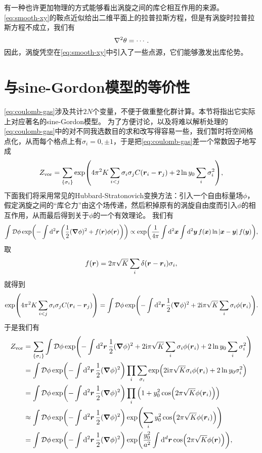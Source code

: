 \documentclass[hyperref, UTF8, a4paper]{ctexart}
\newcommand*{\ii}{\mathrm{i}}
\newcommand*{\fd}[1]{\mathcal{D} #1}
\begin{document}
有一种也许更加物理的方式能够看出涡旋之间的库仑相互作用的来源。\eqref{eq:smooth-xy}的鞍点近似给出二维平面上的拉普拉斯方程，但是有涡旋时拉普拉斯方程不成立，我们有
\[
    \laplacian \theta = \cdots.
\]
因此，涡旋凭空在\eqref{eq:smooth-xy}中引入了一些点源，它们能够激发出库伦势。

\section{与sine-Gordon模型的等价性}\label{sec:sine-gordon}


\eqref{eq:coulomb-gas}涉及共计$2N$个变量，不便于做重整化群计算。本节将指出它实际上对应著名的sine-Gordon模型。
为了方便讨论，以及将难以解析处理的\eqref{eq:coulomb-gas}中的对不同我选数目的求和改写得容易一些，我们暂时将空间格点化，从而每个格点上有$\sigma_i = 0, \pm 1$，于是把\eqref{eq:coulomb-gas}差一个常数因子地写成
\[
    Z_\text{vor} = \sum_{\{\sigma_i\}} \exp(4 \pi^2 K \sum_{i < j} \sigma_i \sigma_j C(\vb*{r}_i - \vb*{r}_j) + 2 \ln y_0 \sum_i \sigma_i^2),
\]
下面我们将采用常见的Hubbard-Stratonovich变换方法：引入一个自由标量场$\phi$，假定涡旋之间的“库仑力”由这个场传递，然后积掉原有的涡旋自由度而引入$\phi$的相互作用，从而最后得到关于$\phi$的一个有效理论。
我们有
\[
    \int \fd{\phi} \exp(- \int \dd[2]{\vb*{r}} \left( \frac{1}{2} (\grad{\phi})^2 + f(\vb*{r}) \phi(\vb*{r}) \right) ) \propto \exp(\frac{1}{4\pi} \int \dd[2]{\vb*{x}} \int \dd[2]{\vb*{y}} f(\vb*{x}) \ln \abs*{\vb*{x} - \vb*{y}} f(\vb*{y})),
\]
取
\[
    f(\vb*{r}) = 2 \pi \sqrt{K} \sum_i \delta(\vb*{r} - \vb*{r}_i) \sigma_i,
\]
就得到
\begin{equation}
    \exp(4 \pi^2 K \sum_{i < j} \sigma_i \sigma_j C(\vb*{r}_i - \vb*{r}_j)) = \int \fd{\phi} \exp(- \int \dd[2]{\vb*{r}} \frac{1}{2} (\grad{\phi})^2 + 2\ii \pi \sqrt{K} \sum_i \sigma_i \phi(\vb*{r}_i) ).
    \label{eq:mixed-sine-gordon-vortices}
\end{equation}
于是我们有
\[
    \begin{aligned}
        Z_\text{vor} &= \sum_{\{\sigma_i\}} \int \fd{\phi} \exp(- \int \dd[2]{\vb*{r}} \frac{1}{2} (\grad{\phi})^2 + 2\ii \pi \sqrt{K} \sum_i \sigma_i \phi(\vb*{r}_i) + 2 \ln y_0 \sum_i \sigma_i^2) \\
        &= \int \fd{\phi} \exp(- \int \dd[2]{\vb*{r}} \frac{1}{2} (\grad{\phi})^2) \prod_i \sum_{\sigma_i} \exp( 2\ii \pi \sqrt{K} \sigma_i \phi(\vb*{r}_i) + 2 \ln y_0  \sigma_i^2) \\
        &= \int \fd{\phi} \exp(- \int \dd[2]{\vb*{r}} \frac{1}{2} (\grad{\phi})^2) \prod_i \left( 1 + y_0^2 \cos (2 \pi \sqrt{K} \phi(\vb*{r}_i)) \right) \\
        &\approx \int \fd{\phi} \exp(- \int \dd[2]{\vb*{r}} \frac{1}{2} (\grad{\phi})^2) \exp(\sum_i y_0^2 \cos(2\pi \sqrt{K} \phi(\vb*{r}_i) )) \\
        &= \int \fd{\phi} \exp(- \int \dd[2]{\vb*{r}} \frac{1}{2} (\grad{\phi})^2) \exp(\frac{y_0^2}{a^2} \int \dd[d]{\vb*{r}} \cos(2\pi \sqrt{K} \phi(\vb*{r}) )),
    \end{aligned}
\]
\end{document}
